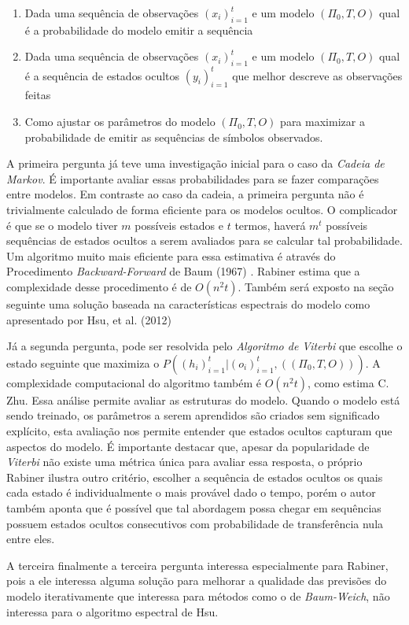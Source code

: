 \documentclass{subfiles}
\begin{document}
\begin{enumerate}
    \item Dada uma sequência de observações $(x_i)_{i=1}^t$ e um modelo $(\Pi_0, T, O)$ qual é a probabilidade do modelo emitir a sequência
    \item Dada uma sequência de observações $(x_i)_{i=1}^t$ e um modelo $(\Pi_0, T, O)$ qual é a sequência de estados ocultos $(y_i)_{i=1}^t$ que melhor descreve as observações feitas
    \item Como ajustar os parâmetros do modelo $(\Pi_0, T, O)$ para maximizar a probabilidade de emitir as sequências de símbolos observados.
\end{enumerate}
A primeira pergunta já teve uma investigação inicial para o caso da \textit{Cadeia de Markov}. É importante avaliar essas probabilidades para se fazer comparações entre modelos. Em contraste ao caso da cadeia, a primeira pergunta não é trivialmente calculado de forma eficiente para os modelos ocultos. O complicador é que se o modelo tiver $m$ possíveis estados e $t$ termos, haverá $m^t$ possíveis sequências de estados ocultos a serem avaliados para se calcular tal probabilidade. Um algoritmo muito mais eficiente para essa estimativa é através do Procedimento \textit{Backward-Forward} de Baum (1967) \autocite{Baum:1967AnIW}. Rabiner estima que a complexidade desse procedimento é de $O(n^2t)$. Também será exposto na seção seguinte uma solução baseada na características espectrais do modelo como apresentado por Hsu, et al. (2012) \autocite{Hsu:20121460}

Já a segunda pergunta, pode ser resolvida pelo \textit{Algoritmo de Viterbi} \autocite{Viterbi:1967EBFC} que escolhe o estado seguinte que maximiza o $P((h_i)_{i=1}^t \vert (o_i)_{i=1}^t, ((\Pi_0, T, O)))$. A complexidade computacional do algoritmo também é $O(n^2t)$, como estima C. Zhu\autocite{ZHU:202127}. Essa análise permite avaliar as estruturas do modelo. Quando o modelo está sendo treinado, os parâmetros a serem aprendidos são criados sem significado explícito, esta avaliação nos permite entender que estados ocultos capturam que aspectos do modelo. É importante destacar que, apesar da popularidade de \textit{Viterbi} não existe uma métrica única para avaliar essa resposta, o próprio Rabiner \autocite{Rabiner:1989tut} ilustra outro critério, escolher a sequência de estados ocultos os quais cada estado é individualmente o mais provável dado o tempo, porém o autor também aponta que é possível que tal abordagem possa chegar em sequências possuem estados ocultos consecutivos com probabilidade de transferência nula entre eles.

A terceira finalmente a terceira pergunta interessa especialmente para Rabiner, pois a ele interessa alguma solução para melhorar a qualidade das previsões do modelo iterativamente que interessa para métodos como o de \textit{Baum-Weich}, não interessa para o algoritmo espectral de Hsu.

\end{document}
